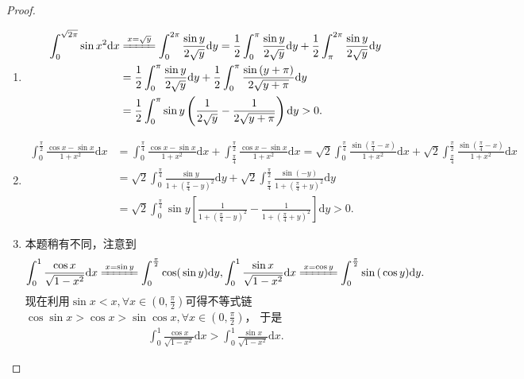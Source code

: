 \documentclass[../../main.tex]{subfiles}
\begin{document}
\begin{proof}
\begin{enumerate}
\item \begin{align*}
\int_0^{\sqrt{2\pi}}{\sin x^2\mathrm{d}x}&\xlongequal{x=\sqrt{y}}\int_0^{2\pi}{\frac{\sin y}{2\sqrt{y}}\mathrm{d}y}=\frac{1}{2}\int_0^{\pi}{\frac{\sin y}{2\sqrt{y}}\mathrm{d}y}+\frac{1}{2}\int_{\pi}^{2\pi}{\frac{\sin y}{2\sqrt{y}}\mathrm{d}y}
\\
&=\frac{1}{2}\int_0^{\pi}{\frac{\sin y}{2\sqrt{y}}\mathrm{d}y}+\frac{1}{2}\int_0^{\pi}{\frac{\sin \left( y+\pi \right)}{2\sqrt{y+\pi}}\mathrm{d}y}
\\
&=\frac{1}{2}\int_0^{\pi}{\sin y\left( \frac{1}{2\sqrt{y}}-\frac{1}{2\sqrt{y+\pi}} \right) \mathrm{d}y}>0.
\end{align*}

\item \begin{align*}
\int_0^{\frac{\pi}{2}}{\frac{\cos x-\sin x}{1+x^2}\mathrm{d}x}&=\int_0^{\frac{\pi}{4}}{\frac{\cos x-\sin x}{1+x^2}\mathrm{d}x}+\int_{\frac{\pi}{4}}^{\frac{\pi}{2}}{\frac{\cos x-\sin x}{1+x^2}\mathrm{d}x}=\sqrt{2}\int_0^{\frac{\pi}{4}}{\frac{\sin \left( \frac{\pi}{4}-x \right)}{1+x^2}\mathrm{d}x}+\sqrt{2}\int_{\frac{\pi}{4}}^{\frac{\pi}{2}}{\frac{\sin \left( \frac{\pi}{4}-x \right)}{1+x^2}\mathrm{d}x}
\\
&=\sqrt{2}\int_0^{\frac{\pi}{4}}{\frac{\sin y}{1+\left( \frac{\pi}{4}-y \right) ^2}\mathrm{d}y}+\sqrt{2}\int_{\frac{\pi}{4}}^{\frac{\pi}{2}}{\frac{\sin \left( -y \right)}{1+\left( \frac{\pi}{4}+y \right) ^2}\mathrm{d}y}
\\
&=\sqrt{2}\int_0^{\frac{\pi}{4}}{\sin y\left[ \frac{1}{1+\left( \frac{\pi}{4}-y \right) ^2}-\frac{1}{1+\left( \frac{\pi}{4}+y \right) ^2} \right] \mathrm{d}y}>0.
\end{align*}

\item 本题稍有不同，注意到
\begin{align*}
\int_0^1{\frac{\cos x}{\sqrt{1-x^2}}\mathrm{d}x\xlongequal{x=\sin y}\int_0^{\frac{\pi}{2}}{\mathrm{cos(}\sin y)\mathrm{d}y,\int_0^1{\frac{\sin x}{\sqrt{1-x^2}}\mathrm{d}x\xlongequal{x=\cos y}\int_0^{\frac{\pi}{2}}{\sin\mathrm{(}\cos y)\mathrm{d}y}}}}.
\end{align*}
现在利用\(\sin x < x, \forall x \in (0, \frac{\pi}{2})\)可得不等式链
\(\cos\sin x > \cos x > \sin\cos x, \forall x \in (0, \frac{\pi}{2})\)，
于是
\begin{align*}
\int_{0}^{1}\frac{\cos x}{\sqrt{1 - x^{2}}}\mathrm{d}x > \int_{0}^{1}\frac{\sin x}{\sqrt{1 - x^{2}}}\mathrm{d}x.
\end{align*} 
\end{enumerate}

\end{proof}
\end{document}
